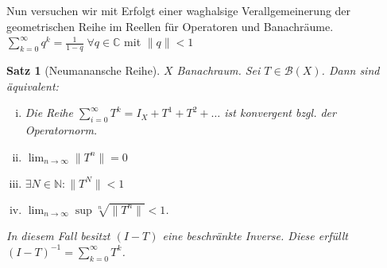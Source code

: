 \documentclass[ngerman]{report}
\theoremstyle{plain}%
\newtheorem{thm}{Satz}[chapter]
\theoremstyle{definition}%
\theoremstyle{myStyle}
\newcommand{\C}{\mathbb{C}}
\newcommand{\N}{\mathbb{N}}
\newcommand{\B}{\mathcal{B}} %
\newcommand{\norm}[1]{\|#1\|}
\newcommand{\limes}[1][\infty]{\lim_{n \to #1}}
\newcommand{\inv}[1]{#1^{-1}}
\newcommand{\disp}{\displaystyle}
\begin{document}
Nun versuchen wir mit Erfolgt einer waghalsige Verallgemeinerung der geometrischen Reihe im Reellen für Operatoren und Banachräume. 
	$\sum_{k=0}^\infty q^k = \frac{1}{1-q} \; \forall q\in\C$ mit $\norm{q} < 1$
	\begin{thm}[Neumanansche Reihe] 
		$X$ Banachraum. Sei $T\in \B(X)$. Dann sind äquivalent: 
			\begin{enumerate}[i)]
				\item Die Reihe $ \sum_{i=0}^\infty T^k = I_X + T^1 + T^2 + \dots$ ist konvergent bzgl. der Operatornorm.
				\item $\disp \limes \norm{T^n} = 0$
				\item $\exists N\in \N: \norm{T^N} < 1$
				\item $\disp \limes \sup \sqrt[n]{\norm{T^n}} < 1$. 
			\end{enumerate}
		In diesem Fall besitzt $(I-T)$ eine beschränkte Inverse.
		Diese erfüllt $\inv{(I-T)} = \sum_{k=0}^\infty T^k$.
	\end{thm}
\end{document}
